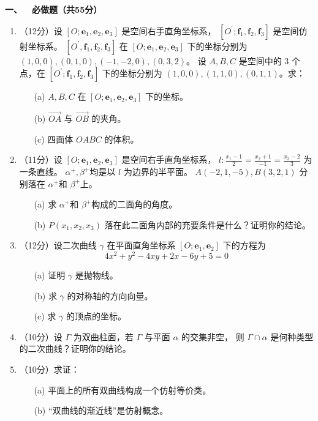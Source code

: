 \textbf{一、\ \ 必做题（共55分）}
\begin{enumerate}
\item（12分）设 $[O ; \mathbf{e}_{1}, \mathbf{e}_{2}, \mathbf{e}_{3}]$ 是空间右手直角坐标系，
$[O^{\prime} ; \mathbf{f}_{1}, \mathbf{f}_{2}, \mathbf{f}_{3}]$ 是空间仿射坐标系。
$[O^{\prime}, \mathbf{f}_{1}, \mathbf{f}_{2}, \mathbf{f}_{3}]$ 
在 $[O ; \mathbf{e}_{1}, \mathbf{e}_{2}, \mathbf{e}_{3}]$ 下的坐标分别为 $(1,0,0),(0,1,0),(-1,-2,0),(0,3,2)$。
设 $A, B, C$ 是空间中的 $3$ 个点，在 $[O^{\prime} ; \mathbf{f}_{1}, \mathbf{f}_{2}, \mathbf{f}_{3}]$ 下的坐标分别为 $(1,0,0),(1,1,0),(0,1,1)$。求：
\begin{itemize}
\item[(a)] $A, B, C$ 在 $[O ; \mathbf{e}_{1}, \mathbf{e}_{2}, \mathbf{e}_{3}]$ 下的坐标。
\item[(b)] $\overrightarrow{OA}$ 与 $\overrightarrow{OB}$ 的夹角。
\item[(c)] 四面体 $OABC$ 的体积。
\end{itemize}
\item（11分）设 $[O ; \mathbf{e}_{1}, \mathbf{e}_{2}, \mathbf{e}_{3}]$ 是空间右手直角坐标系，
$l: \frac{x_{1}-1}{2}=\frac{x_{2}+1}{-1}=\frac{x_{3}-2}{3}$ 为一条直线。
$\alpha^{+}, \beta^{+}$均是以 $l$ 为边界的半平面。
$A(-2,1,-5), B(3,2,1)$ 分别落在 $\alpha^{+}$和 $\beta^{+}$上。
\begin{itemize}
\item[(a)] 求 $\alpha^{+}$和 $\beta^{+}$构成的二面角的角度。
\item[(b)] $P(x_{1}, x_{2}, x_{3})$ 落在此二面角内部的充要条件是什么？证明你的结论。
\end{itemize}
\item（12分）设二次曲线 $\gamma$ 在平面直角坐标系 $[O ; \mathbf{e}_{1}, \mathbf{e}_{2}]$ 下的方程为
$$4x^{2}+y^{2}-4xy+2x-6y+5=0$$
\begin{itemize}
\item[(a)] 证明 $\gamma$ 是抛物线。
\item[(b)] 求 $\gamma$ 的对称轴的方向向量。
\item[(c)] 求 $\gamma$ 的顶点的坐标。
\end{itemize}
\item（10分）设 $\Gamma$ 为双曲柱面，若 $\Gamma$ 与平面 $\alpha$ 的交集非空，
则 $\Gamma \cap \alpha$ 是何种类型的二次曲线？证明你的结论。
\item（10分）求证：
\begin{itemize}
\item[(a)] 平面上的所有双曲线构成一个仿射等价类。
\item[(b)] ``双曲线的渐近线''是仿射概念。
\end{itemize}
\end{enumerate}

